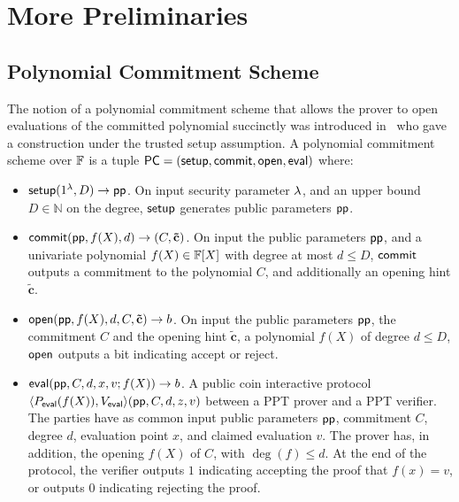 \section{More Preliminaries}

\subsection{Polynomial Commitment Scheme}
\label{sec:pcs_def}
The notion of a polynomial commitment scheme that allows the prover to open evaluations of the committed polynomial succinctly was introduced in~\cite{AC:KatZavGol10} who gave a construction under the trusted setup assumption.
A polynomial commitment scheme over $\mathbb{F}$ is a tuple $\mathsf{PC} = 
(\mathsf{setup},\mathsf{commit},\mathsf{open},\mathsf{eval})$ where:

\begin{itemize}
    \item $\mathsf{setup}(1^{\lambda},D) \rightarrow \mathsf{pp}$. On input security parameter $\lambda$, and an upper bound $D \in \mathbb{N}$ on the degree, $\mathsf{setup}$ generates public parameters $\mathsf{pp}$.
    
    \item $\mathsf{commit}(\mathsf{pp}, f(X),d) \rightarrow (C,\mathbf{\tilde{c}})$. On input the public parameters $\mathsf{pp}$, and a univariate polynomial $f(X) \in \mathbb{F}[X]$ with degree at most $d \leq D$, $\mathsf{commit}$ outputs a commitment to the polynomial $C$, and additionally an opening hint $\mathbf{\tilde{c}}$.
	
	\item $\mathsf{open}(\mathsf{pp},f(X),d,C,\mathbf{\tilde{c}}) \rightarrow b$. On input the public parameters $\mathsf{pp}$, the commitment $C$ and the opening hint $\mathbf{\tilde{c}}$, a polynomial $f(X)$ of degree $d \leq D$, $\mathsf{open}$ outputs a bit indicating accept or reject. 
    
	    \item $\mathsf{eval}(\mathsf{pp},C,d,x,v;f(X)) \rightarrow b $. A public coin interactive protocol 
	    $\langle P_{\mathsf{eval}}(f(X)), V_{\mathsf{eval}} \rangle(\mathsf{pp},C,d,z,v)$ between a PPT prover and a PPT verifier. The parties have as common input public parameters $\mathsf{pp}$, commitment $C$, degree $d$, evaluation point $x$, and claimed evaluation $v$. The prover has, in addition, the opening $f(X)$ of $C$, with $\deg(f) \leq d$. At the end of the protocol, the verifier outputs $1$ indicating accepting the proof that $f(x)=v$, or outputs $0$ indicating rejecting the proof.
		
		\end{itemize}
		
